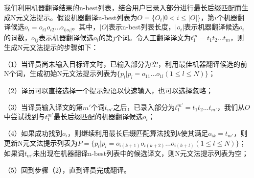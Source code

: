 我们利用机器翻译结果的n-best列表，结合用户已录入部分进行最长后缀匹配而生成N元文法提示。假设机器翻译n-best列表为$O=\{O_i | 0 < i \le |O|\}$，第$i$个机器翻译候选$o_i=o_{i1}o_{i2} \ldots o_{i|o_i|}$。其中，$|O|$表示n-best列表长度，$|o_i|$表示机器翻译候选$o_i$的词数，$o_{ij}$表示机器翻译候选$o_i$的第$j$个词。令人工翻译译文为$t_1^m=t_1t_2 \ldots t_m$，则生成N元文法提示的步骤如下：

（1）当译员尚未输入目标译文时，已输入部分为空，利用最佳机器翻译候选的前N个词，生成初始N元文法提示列表为$\{p_l | p_l=o_{11} \ldots o_{1l} (1 \le l \le N)\}$；

（2）译员可以直接选择一个提示短语以快速输入，也可以选择忽略；

（3）当译员输入译文的第$m'$个词$t_{m'}$之后，已录入部分为$t_1^{m'}=t_1 t_2 \ldots t_{m'}$，我们从$O$中尝试找到与$t_1^{m'}$最长后缀匹配的机器翻译候选$o_i$；

（4）如果成功找到$o_i $，则继续利用最长后缀匹配算法找到$k$使其满足$o_{ik}=t_{m'}$，则更新N元文法提示列表为$P=\{p_l |p_l=o_{i(k+1)}  o_{i(k+2)} \ldots o_{i(k+l)} (1 \le l \le N)\}$；如果词$t_{m'}$未出现在机器翻译n-best列表中的候选译文，则N元文法提示列表为空；

（5）回到步骤（2），直到译员完成翻译。

